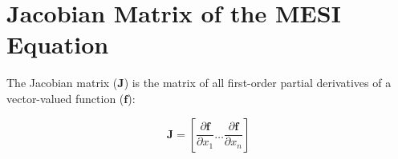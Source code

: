 
\chapter{Jacobian Matrix of the MESI Equation}

The Jacobian matrix ($\bm{J}$) is the matrix of all first-order partial derivatives of a vector-valued function ($\bm{f}$):

\begin{equation}
    \bm{J} = \left[\frac{\partial \bm{f}}{\partial x_1} \ldots \frac{\partial \bm{f}}{\partial x_n}\right]
\end{equation}
